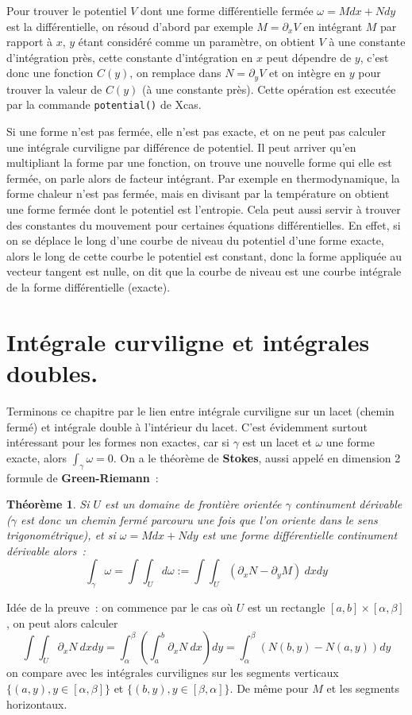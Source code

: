 \documentclass[a4paper,11pt]{book}
\newtheorem{thm}{Théorème}
\begin{document}
\begin{giacjshere}
Pour trouver le potentiel 
$V$ dont une forme diff\'erentielle ferm\'ee
$\omega=M dx+Ndy$ est la diff\'erentielle, on r\'esoud d'abord par exemple 
$ M = \partial_x V $
en int\'egrant $M$ par rapport \`a $x$, $y$ \'etant consid\'er\'e
comme un param\`etre, on obtient $V$ \`a une constante d'int\'egration
pr\`es, cette constante d'int\'egration en $x$ peut d\'ependre
de $y$, c'est donc une fonction $C(y)$, 
on remplace dans $N=\partial_y V$ et on int\`egre
en $y$ pour trouver la valeur de $C(y)$ (\`a une constante pr\`es).
Cette op\'eration est execut\'ee par la commande \verb|potential()|
de Xcas.

Si une forme n'est pas ferm\'ee, elle n'est pas exacte, et on ne peut
pas calculer une int\'egrale curviligne par diff\'erence de potentiel.
Il peut arriver qu'en multipliant la forme par une fonction, on trouve
une nouvelle forme qui elle est ferm\'ee, on parle alors de facteur
int\'egrant. Par exemple en thermodynamique, la forme chaleur
n'est pas ferm\'ee, mais en divisant par la temp\'erature on
obtient une forme ferm\'ee dont le potentiel est l'entropie.
Cela peut aussi servir \`a trouver des constantes du mouvement
pour certaines \'equations diff\'erentielles. En effet, si on
se d\'eplace le long d'une courbe de niveau du potentiel
d'une forme exacte, alors le long de cette courbe le potentiel
est constant, donc la forme appliqu\'ee au vecteur tangent
est nulle, on dit que la courbe de niveau est une courbe
int\'egrale de la forme diff\'erentielle (exacte).

\section{Int\'egrale curviligne et int\'egrales doubles.}
Terminons ce chapitre par le lien entre int\'egrale curviligne
sur un lacet (chemin ferm\'e) et int\'egrale double \`a l'int\'erieur 
du lacet. C'est \'evidemment surtout int\'eressant pour les
formes non exactes, car si $\gamma$ est un lacet et $\omega$
une forme exacte, alors $\int_\gamma \omega=0$.
On a le th\'eor\`eme de {\bf Stokes}, 
aussi appel\'e en dimension 2 
formule de {\bf Green-Riemann}~:
\begin{thm}
Si $U$ est un domaine de fronti\`ere orient\'ee
$\gamma$ continument d\'erivable 
($\gamma$ est donc un chemin ferm\'e parcouru une fois que
l'on oriente dans le sens trigonom\'etrique), et si 
$\omega=Mdx + N dy$ est une forme
diff\'erentielle continument d\'erivable alors~:
$$ \int_\gamma \omega = \int\int_U d\omega := 
\int \int_U (\partial_x N -\partial_y M) \ dx dy$$
\end{thm}
Id\'ee de la preuve~: on commence par le cas o\`u $U$ est un
rectangle $[a,b] \times [\alpha,\beta]$, on peut alors calculer 
$$ \int \int_U \partial_x N  \ dx dy 
= \int_\alpha^\beta (\int_a^b \partial_x N  \ dx) dy
= \int_\alpha^\beta (N(b,y)-N(a,y)) dy $$
on compare avec les int\'egrales curvilignes sur les segments verticaux
$\{(a,y), y \in [\alpha,\beta]\}$ et $\{(b,y), y \in [\beta,\alpha]\}$.
De m\^eme pour $M$ et les segments horizontaux.


\end{giacjshere}
\end{document}
